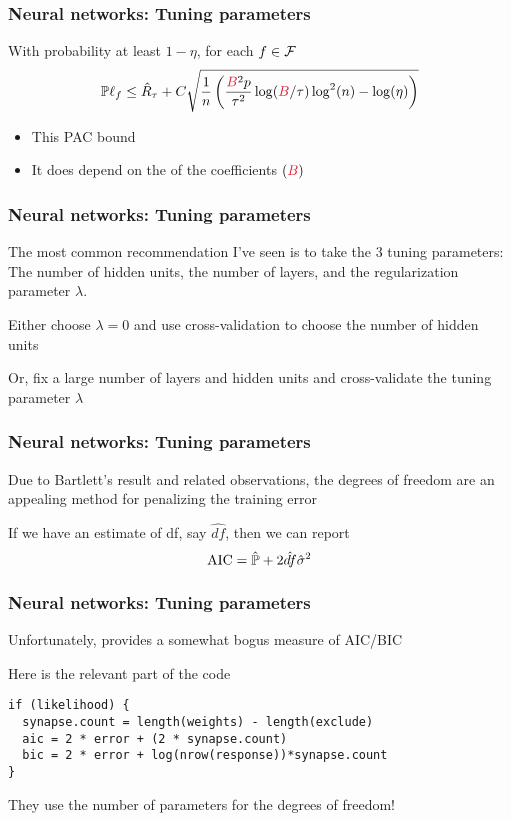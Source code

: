 \documentclass[12pt]{beamer}
\begin{document}
\begin{frame}[fragile]
\frametitle{Neural networks: Tuning parameters}
 With probability at least $1-\eta$, for each $f \in \F$
\[
\P \ell_f \leq \hat R_{\tau}  + C\sqrt{\frac{1}{n}\left( \frac{\alr{B}^2p}{\tau^2}\log(\alr{B}/\tau)\log^2(n) - \log(\eta)\right)}
\]
\begin{itemize}
\item This PAC bound 
\item It does depend on the  of the coefficients $(\alr{B})$
\end{itemize}
\end{frame}

\begin{frame}[fragile]
\frametitle{Neural networks: Tuning parameters}
The most common recommendation I've seen is to take the 3 tuning parameters: The number of hidden units, the number
of layers, and the regularization parameter $\lambda$.

\vsp
Either choose $\lambda = 0$ and use cross-validation to choose the number of hidden units


\vsp
Or, fix a large number of layers and hidden units and cross-validate the tuning parameter $\lambda$

\end{frame}

\begin{frame}[fragile]
\frametitle{Neural networks: Tuning parameters}
Due to Bartlett's result and related observations, the degrees of freedom are an appealing method for penalizing the 
training error

\vsp
If we have an estimate of df, say $\hat{df}$, then we can report 
\[
\textrm{AIC} = \hat\P + 2\hat{df}\hat\sigma^2
\]
\end{frame}

\begin{frame}[fragile]
\frametitle{Neural networks: Tuning parameters}
Unfortunately,  provides a somewhat bogus measure of AIC/BIC

\vsp
Here is the relevant part of the code
\begin{verbatim}
if (likelihood) {
  synapse.count = length(weights) - length(exclude) 
  aic = 2 * error + (2 * synapse.count)
  bic = 2 * error + log(nrow(response))*synapse.count
}
\end{verbatim}
They use the number of parameters for the degrees of freedom!
\end{frame}
\end{document}
